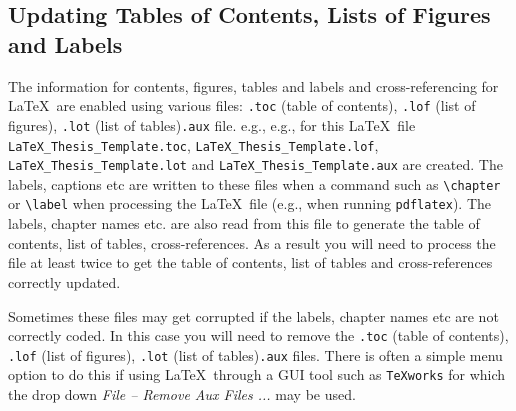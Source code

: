 \documentclass[12pt,oneside]{book} %
\begin{document}
\subsection{Updating Tables of Contents, Lists of Figures and Labels}
The information for contents, figures, tables and labels and cross-referencing for \LaTeX\ are enabled using various files: \verb#.toc# (table of contents), \verb#.lof# (list of figures), \verb#.lot# (list of tables)\verb#.aux# file. e.g., e.g., for this \LaTeX\ file \verb#LaTeX_Thesis_Template.toc#, \verb#LaTeX_Thesis_Template.lof#, \verb#LaTeX_Thesis_Template.lot# and \linebreak \verb#LaTeX_Thesis_Template.aux# are created. The labels, captions etc  are written to these files when a command such as \verb#\chapter# or \verb#\label# when processing the \LaTeX\ file (e.g., when running \verb#pdflatex#).   The labels, chapter names etc. are also read from this file to generate the table of contents, list of tables, cross-references. As a result you will need to process the file at least twice to get the table of contents, list of tables and cross-references correctly updated.

Sometimes these files may get corrupted if the labels, chapter names etc are not correctly coded. In this case you will need to remove the \verb#.toc# (table of contents), \verb#.lof# (list of figures), \verb#.lot# (list of tables)\verb#.aux# files. There is often a simple menu option to do this if using \LaTeX\ through a GUI tool such as \verb#TeXworks# for which the drop down {\em File -- Remove Aux Files ...} may be used.
\end{document}
